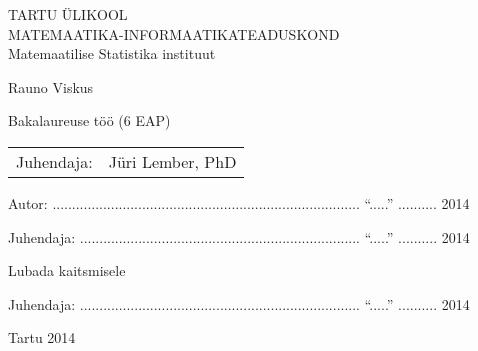 \thispagestyle{empty}
\begin{center}

\large
\uppercase{TARTU ÜLIKOOL}\\[2mm]
\uppercase{Matemaatika-Informaatikateaduskond}\\[2mm]
Matemaatilise Statistika instituut

\vspace{25mm}

\Large Rauno Viskus

\vspace{4mm}

\huge \thesisTitle

\vspace{20mm}

\Large Bakalaureuse töö (6 EAP)

\end{center}

\vspace{2mm}

\begin{flushright}
 {
 \setlength{\extrarowheight}{5pt}
 \begin{tabular}{r l} 
  Juhendaja: & Jüri Lember, PhD
 \end{tabular}
 }
\end{flushright}

\vspace{10mm}

{\noindent Autor: ............................................................................... ``.....'' ..........\hskip16pt 2014}
\vspace{2mm}

{\noindent Juhendaja: ........................................................................ ``.....'' ..........\hskip16pt 2014}

\vspace{8mm}

{\noindent Lubada kaitsmisele}

{\noindent Juhendaja: ........................................................................ ``.....'' ..........\hskip16pt 2014}

\vfill
\centerline{Tartu 2014}

